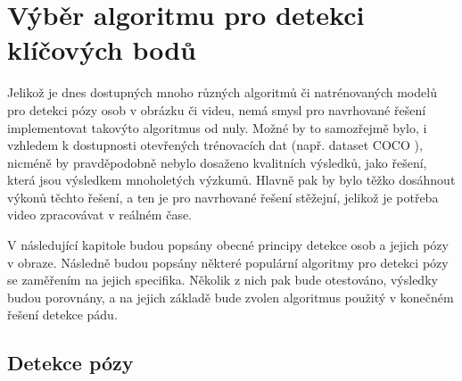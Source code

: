 \chapter{Výběr algoritmu pro detekci klíčových bodů}
\label{chap:Pose}

Jelikož je dnes dostupných mnoho různých algoritmů či natrénovaných modelů pro
detekci pózy osob v obrázku či videu, nemá smysl pro navrhované řešení
implementovat takovýto algoritmus od nuly. Možné by to samozřejmě bylo, i
vzhledem k dostupnosti otevřených trénovacích dat (např. dataset COCO
\cite{coco}), nicméně by pravděpodobně nebylo dosaženo kvalitních výsledků,
jako řešení, která jsou výsledkem mnoholetých výzkumů. Hlavně pak by bylo těžko
dosáhnout výkonů těchto řešení, a ten je pro navrhované řešení stěžejní,
jelikož je potřeba video zpracovávat v reálném čase.

V následující kapitole budou popsány obecné principy detekce osob a jejich pózy
v obraze. Následně budou popsány některé populární algoritmy pro detekci pózy
se zaměřením na jejich specifika. Několik z nich pak bude otestováno, výsledky
budou porovnány, a na jejich základě bude zvolen algoritmus použitý v konečném
řešení detekce pádu.

\section{Detekce pózy}


